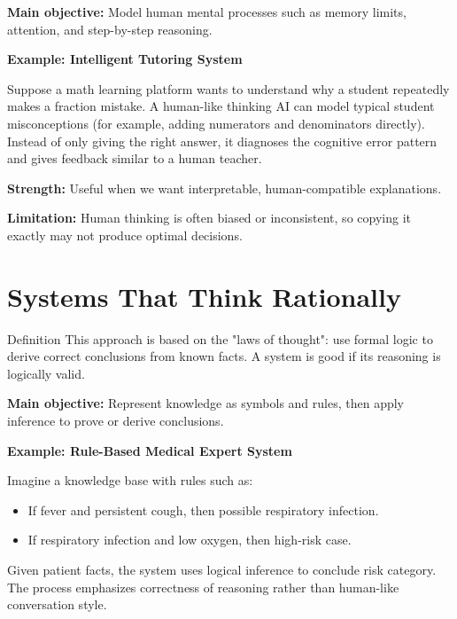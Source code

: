 \documentclass[12pt,a4paper]{article}
\begin{document}
\textbf{Main objective:} Model human mental processes such as memory limits, attention, and step-by-step reasoning.

\begin{examplebox}
\textbf{Example: Intelligent Tutoring System}

Suppose a math learning platform wants to understand why a student repeatedly makes a fraction mistake.
A human-like thinking AI can model typical student misconceptions (for example, adding numerators and denominators directly).
Instead of only giving the right answer, it diagnoses the cognitive error pattern and gives feedback similar to a human teacher.
\end{examplebox}

\textbf{Strength:} Useful when we want interpretable, human-compatible explanations.

\textbf{Limitation:} Human thinking is often biased or inconsistent, so copying it exactly may not produce optimal decisions.

\section{Systems That Think Rationally}

\begin{typebox}{Definition}
This approach is based on the "laws of thought": use formal logic to derive correct conclusions from known facts.
A system is good if its reasoning is logically valid.
\end{typebox}

\textbf{Main objective:} Represent knowledge as symbols and rules, then apply inference to prove or derive conclusions.

\begin{examplebox}
\textbf{Example: Rule-Based Medical Expert System}

Imagine a knowledge base with rules such as:
\begin{itemize}[noitemsep]
    \item If fever and persistent cough, then possible respiratory infection.
    \item If respiratory infection and low oxygen, then high-risk case.
\end{itemize}
Given patient facts, the system uses logical inference to conclude risk category.
The process emphasizes correctness of reasoning rather than human-like conversation style.
\end{examplebox}
\end{document}
